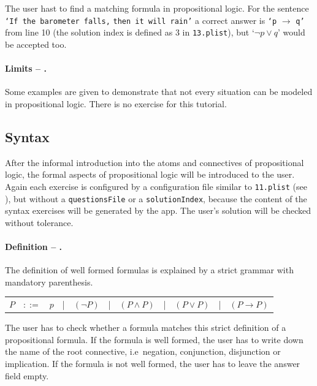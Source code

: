The user hast to find a matching formula in propositional logic.
For the sentence
\verb+‘If the barometer falls,+ \verb+then it will rain’+ 
a correct answer is
\verb+‘p+ $\rightarrow$ \verb+q’+ 
from line 10 
(the solution index is defined as 3 in \verb+13.plist+),
but 
‘$\neg p \vee q$’ would be accepted too.

\paragraph{Limits – .}
\label{tut:14}
Some examples are given to demonstrate that not every situation can be modeled in propositional logic. 
There is no exercise for this tutorial.


\subsection{Syntax}

After the informal introduction into the atoms and connectives of propositional logic, 
the formal aspects of propositional logic will be introduced to the user.
Again each exercise is configured by a configuration file similar to 
\verb+11.plist+ (see ),
but without a \verb+questionsFile+ or a \verb+solutionIndex+,
because the content of the syntax exercises will be generated by the app.
The user's solution will be checked without tolerance.

\paragraph{Definition – .}
\label{tut:21}
The definition of well formed formulas is explained by a strict grammar with mandatory parenthesis.

\begin{center}
\begin{tabular}{rcccccccccc}
$P$	&$::=$	&$p$ 	
	&|		& $(\neg P)$ 
	&|		&  $(P \wedge P)$ 
	&|		&  $(P \vee P)$ 
	&|		&  $(P \rightarrow P)$ \\
\end{tabular}
\end{center}

The user has to check whether a formula matches this strict definition of 
a propositional formula.
If the formula is well formed, the user has to write down the name of the root connective, 
i.e\ negation, conjunction, disjunction or implication. 
If the formula is not well formed, the user has to leave the answer field empty.

